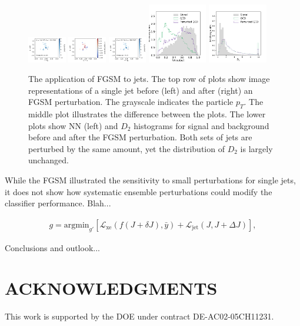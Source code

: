 \documentclass[reprint,nofootinbib,...]{revtex4-1}
\begin{document}
\begin{figure}[h!]
\centering
\includegraphics[width=0.15\textwidth]{figures/panel_1.pdf}
\includegraphics[width=0.15\textwidth]{figures/panel_3.pdf}
\includegraphics[width=0.15\textwidth]{figures/panel_2.pdf}
\includegraphics[width=0.23\textwidth]{figures/NN_FGSM.pdf}
\includegraphics[width=0.23\textwidth]{figures/D2_FGSM.pdf}
\caption{The application of FGSM to jets.  The top row of plots show image representations of a single jet before (left) and after (right) an FGSM perturbation.  The grayscale indicates the particle $p_T$.  The middle plot illustrates the difference between the plots.  The lower plots show NN (left) and $D_2$ histograms for signal and background before and after the FGSM perturbation.  Both sets of jets are perturbed by the same amount, yet the distribution of $D_2$ is largely unchanged. }
\label{fig:FGSM}
\end{figure}

While the FGSM illustrated the sensitivity to small perturbations for single jets, it does not show how systematic ensemble perturbations could modify the classifier performance.  Blah...

\begin{align}
\label{eq:global}
g=\text{argmin}_{g'}\left[\mathcal{L}_\text{xe}(f(J+\delta J),\bar{y})+\mathcal{L}_\text{jet}(J,J+\Delta J)\right],
\end{align}

Conclusions and outlook...

\section*{ACKNOWLEDGMENTS}

This work is supported by the DOE under contract DE-AC02-05CH11231. 


\end{document}
